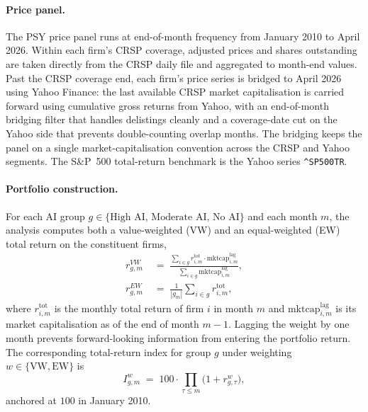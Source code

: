 \paragraph{Price panel.} The PSY price panel runs at end-of-month frequency from January 2010 to April 2026. Within each firm's CRSP coverage, adjusted prices and shares outstanding are taken directly from the CRSP daily file and aggregated to month-end values. Past the CRSP coverage end, each firm's price series is bridged to April 2026 using Yahoo Finance: the last available CRSP market capitalisation is carried forward using cumulative gross returns from Yahoo, with an end-of-month bridging filter that handles delistings cleanly and a coverage-date cut on the Yahoo side that prevents double-counting overlap months. The bridging keeps the panel on a single market-capitalisation convention across the CRSP and Yahoo segments. The S\&P~500 total-return benchmark is the Yahoo series \texttt{\^{}SP500TR}.

\paragraph{Portfolio construction.} For each AI group $g \in \{\text{High AI},\,\text{Moderate AI},\,\text{No AI}\}$ and each month $m$, the analysis computes both a value-weighted (VW) and an equal-weighted (EW) total return on the constituent firms,
\begin{align}
    r^{VW}_{g,m} \;&=\; \frac{\sum_{i \in g} r^{\text{tot}}_{i,m} \cdot \text{mktcap}^{\text{lag}}_{i,m}}{\sum_{i \in g} \text{mktcap}^{\text{lag}}_{i,m}},
        \label{eq:vw-portfolio} \\
    r^{EW}_{g,m} \;&=\; \frac{1}{|g_m|} \sum_{i \in g} r^{\text{tot}}_{i,m},
        \label{eq:ew-portfolio}
\end{align}
where $r^{\text{tot}}_{i,m}$ is the monthly total return of firm $i$ in month $m$ and $\text{mktcap}^{\text{lag}}_{i,m}$ is its market capitalisation as of the end of month $m-1$. Lagging the weight by one month prevents forward-looking information from entering the portfolio return. The corresponding total-return index for group $g$ under weighting $w \in \{\text{VW},\text{EW}\}$ is
\begin{equation}
    I^{w}_{g,m} \;=\; 100 \cdot \prod_{\tau \leq m} \big(1 + r^{w}_{g,\tau}\big),
    \label{eq:tr-index}
\end{equation}
anchored at $100$ in January 2010.

